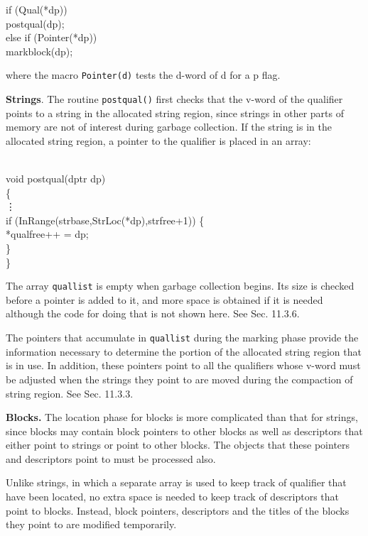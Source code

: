 \begin{iconcode}
\>if (Qual(*dp))\\
\>\>postqual(dp);\\
\>else if (Pointer(*dp))\\
\>\>markblock(dp);
\end{iconcode}


\noindent
where the macro \texttt{Pointer(d)} tests the d-word of d for a p flag.

\textbf{Strings}. The routine \texttt{postqual()} first checks that
the v-word of the qualifier points to a string in the allocated string
region, since strings in other parts of memory are not of interest
during garbage collection. If the string is in the allocated string
region, a pointer to the qualifier is placed in an array:

\begin{iconcode}\\
\>void postqual(dptr dp)\\
\>\{\\
\>\>\>\vdots\\
\>if (InRange(strbase,StrLoc(*dp),strfree+1)) \{\\
\>\>*qualfree++ = dp;\\
\>\>\}\\
\>\}
\end{iconcode}



The array \texttt{quallist} is empty when garbage collection
begins. Its size is checked before a pointer is added to it, and more
space is obtained if it is needed although the code for doing that is
not shown here. See Sec. 11.3.6.

The pointers that accumulate in \texttt{quallist} during the marking
phase provide the information necessary to determine the portion of
the allocated string region that is in use. In addition, these
pointers point to all the qualifiers whose v-word must be adjusted
when the strings they point to are moved during the compaction of
string region. See Sec. 11.3.3.

\textbf{Blocks. }The location phase for blocks is more complicated
than that for strings, since blocks may contain block pointers to
other blocks as well as descriptors that either point to strings or
point to other blocks.  The objects that these pointers and
descriptors point to must be processed also.

Unlike strings, in which a separate array is used to keep track of
qualifier that have been located, no extra space is needed to keep
track of descriptors that point to blocks. Instead, block pointers,
descriptors and the titles of the blocks they point to are modified
temporarily.

